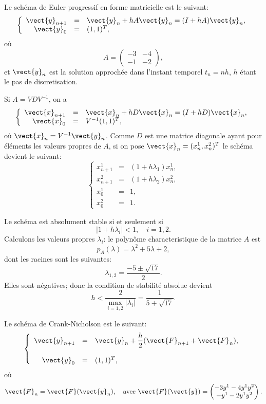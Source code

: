 \documentclass[11pt]{article}
\begin{document}
\newpage
\begin{Answer}[ref={ex:1}]
  \Question
Le sch\'ema de Euler progressif en forme matricielle est le suivant:
$$
\left\{
\begin{array}{rcl}
\vect{y}_{n+1} & = & \vect{y}_n + h A \vect{y}_n = (I + h A) \vect{y}_n, \\
\vect{y}_0 & = & (1, 1)^T,
\end{array}\right.
$$
o\`u
$$
A =
\begin{pmatrix}
-3 & -4 \\
-1 & -2
\end{pmatrix}
,
$$
et $\vect{y}_n$ est la solution approch\'ee dans l'instant temporel $t_n = nh$, $h$ \'etant
le pas de discretisation.

\Question
Si $A = V D V^{-1}$, on a
$$
\left\{
\begin{array}{rcl}
\vect{x}_{n+1} & = & \vect{x}_n + h D \vect{x}_n = (I + h D) \vect{x}_n, \\
\vect{x}_0 & = & V^{-1} (1, 1)^T,
\end{array}\right.
$$
o\`u $\vect{x}_n = V^{-1} \vect{y}_n$. Comme $D$ est une matrice diagonale
ayant pour \'el\'ements les valeurs propres de $A$, si on pose $\vect{x}_n = (x^1_n, x^2_n)^T$ le sch\'ema
devient le suivant:
$$
\left\{
\begin{array}{rcl}
x^1_{n+1} & = & (1 + h \lambda_1) x^1_n, \\
x^2_{n+1} & = & (1 + h \lambda_2) x^2_n, \\
x^1_0 &=& 1 , \\
x^2_0 &=& 1 .
\end{array}\right.
$$


\Question
Le sch\'ema est absolument stable si et seulement si
$$
|1 + h\lambda_i| < 1, \quad i = 1,2.
$$
Calculons les valeurs propres $\lambda_i$: le polyn\^ome
characteristique de la matrice $A$ est
$$
p_A(\lambda) = \lambda^2 + 5 \lambda + 2,
$$
dont les racines sont les suivantes:
$$
\lambda_{1,2} = \frac{-5 \pm \sqrt{17}}{2}.
$$
Elles sont n\'egatives; donc
la condition de stabilit\'e absolue devient
$$
h < \frac{2}{\max_{i=1,2} | \lambda_i| } = \frac{1}{5 + \sqrt{17}}.
$$


\Question
Le sch\'ema de Crank-Nicholson est le suivant:
$$
\left\{
\begin{array}{rcl}
\vect{y}_{n+1} & = & \displaystyle
\vect{y}_n + \frac{h}{2} (\vect{F}_{n+1} + \vect{F}_n ), \\ \\
\vect{y}_0 & = & (1, 1)^T,
\end{array}\right.
$$
o\`u
$$
\vect{F}_n = \vect{F}(\vect{y}_n),
 \quad \text{avec} \
\vect{F}(\vect{y}) =
\begin{pmatrix}
-3 y^1 -4 y^1y^2 \\
-y^1 -2 y^1y^2
\end{pmatrix}
.
$$


\end{Answer}
\end{document}
